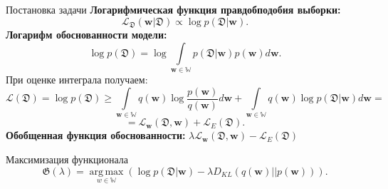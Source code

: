\documentclass[9pt,pdf,hyperref={unicode}]{beamer}
\DeclareMathOperator*{\argmax}{arg\,max}
\begin{document}
\begin{frame}[shrink=5]{Постановка задачи}
    \textbf{Логарифмическая функция правдобподобия выборки:}
		\begin{equation*}
            \mathcal{L}_\mathfrak{D}(\mathbf{w}|\mathfrak{D}) \propto \log p(\mathfrak{D}|\mathbf{w}).
        \end{equation*}	
    \textbf{Логарифм обоснованности модели:}
        \begin{equation*}
            \log p(\mathfrak{D}) = \log \int\limits_{\mathbf{w}\in \mathbb{W}} p(\mathfrak{D}|\mathbf{w})p(\mathbf{w}) d\mathbf{w}.
        \end{equation*}
    При оценке интеграла получаем:
    \begin{equation*}
        \mathcal{L}(\mathfrak{D}) = \log p(\mathfrak{D}) \geq \int\limits_{\mathbf{w}\in \mathbb{W}} q(\mathbf{w}) \log \frac{p(\mathbf{w})}{q(\mathbf{w})}d\mathbf{w} + \int\limits_{\mathbf{w}\in \mathbb{W}} q(\mathbf{w}) \log p(\mathfrak{D}|\mathbf{w})d\mathbf{w} =
    \end{equation*}
    \begin{equation*}
     = \mathcal{L}_{\mathbf{w}}(\mathfrak{D}, \mathbf{w}) + \mathcal{L}_E (\mathfrak{D}).
    \end{equation*}
    \textbf{Обобщенная функция обоснованности:}
    $ \lambda\mathcal{L}_{\mathbf{w}}(\mathfrak{D}, \mathbf{w}) - \mathcal{L}_E (\mathfrak{D})$
    \begin{block}{Максимизация функционала} 
       \begin{equation*}
            \label{nohyper}
            \mathfrak{G}(\lambda) = \argmax\limits_{w \in \mathbb{W}} ( \log p(\mathfrak{D}| \mathbf{w})  - \lambda D_{KL}(q(\mathbf{w})||p(\mathbf{w})) ).
        \end{equation*}
    \end{block}
    
    
\end{frame}
\end{document}
